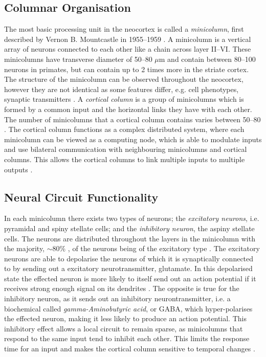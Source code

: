 \subsection{Columnar Organisation}
The most basic processing unit in the neocortex is called a \textit{minicolumn}, first described by Vernon B. Mountcastle in 1955--1959 \cite{doi:10.1093/cercor/13.1.2}. A minicolumn is a vertical array of neurons connected to each other like a chain across layer II--VI. These minicolumns have transverse diameter of 50--80 $\mu$m and contain between 80--100 neurons in primates, but can contain up to 2 times more in the striate cortex. The structure of the minicolumn can be observed throughout the neocortex, however they are not identical as some features differ, e.g. cell phenotypes, synaptic transmitters \cite{doi:10.1093/cercor/13.1.2}. A \textit{cortical column} is a group of minicolumns which is formed by a common input and the horizontal links they have with each other. The number of minicolumns that a cortical column contains varies between 50--80 \cite{doi:10.1093/cercor/13.1.2}. The cortical column functions as a complex distributed system, where each minicolumn can be viewed as a computing node, which is able to modulate inputs and use bilateral communication with neighbouring minicolumns and cortical columns. This allows the cortical columns to link multiple inputs to multiple outputs \cite{MountcastleVernon1997}.


\subsection{Neural Circuit Functionality}
In each minicolumn there exists two types of neurons; the \textit{excitatory neurons}, i.e. pyramidal and spiny stellate cells; and the \textit{inhibitory neuron}, the aspiny stellate cells. The neurons are distributed throughout the layers in the minicolumn with the majority, $\sim$80\% , of the neurons being of the excitatory type \cite{Neocortex}. The excitatory neurons are able to depolarise the neurons of which it is synaptically connected to by sending out a excitatory neurotransmitter, glutamate. In this depolarised state the effected neuron is more likely to itself send out an action potential if it receives strong enough signal on its dendrites \cite{Neocortex}. The opposite is true for the inhibitory neuron, as it sends out an inhibitory neurontransmitter, i.e. a biochemical called \textit{gamma-Aminobutyric acid}, or GABA, which hyper-polarises the effected neuron, making it less likely to produce an action potential. This inhibitory effect allows a local circuit to remain sparse, as minicolumns that respond to the same input tend to inhibit each other. This limits the response time for an input and makes the cortical column sensitive to temporal changes \cite{Neocortex}. 


